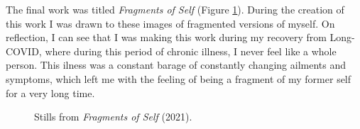 The final work was titled \textit{Fragments of Self} \citeyearpar{broad2021fragments} (Figure \ref{fig:c7:fragments}). 
During the creation of this work I was  drawn to these images of fragmented versions of myself. 
On reflection, I can see that I was making this work during my recovery from Long-COVID, where during this period of chronic illness, I never feel like a whole person. 
This ilness was a constant barage of constantly changing ailments and symptoms, which left me with the feeling of being a fragment of my former self for a very long time.

\begin{figure}[!htbp]
    \centering
    \hfill
    \hfill
    \caption[Stills from \textit{Fragments of Self}]{Stills from \textit{Fragments of Self} (2021).}
    \label{fig:c7:fragments}
 \end{figure}

